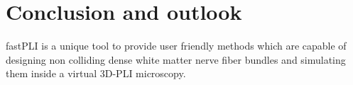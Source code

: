 \setcounter{chapter}{8}
\chapter{Conclusion and outlook}
\label{sec:summary}
% 
\ac{fastPLI} is a unique tool to provide user friendly methods which are capable of designing non colliding dense white matter nerve fiber bundles and simulating them inside a virtual \ac{3D-PLI} microscopy.
% 
\paragraph{}
% 
\paragraph{}
% 
\paragraph{}
% 
\paragraph{}
% 
\paragraph{}
% 